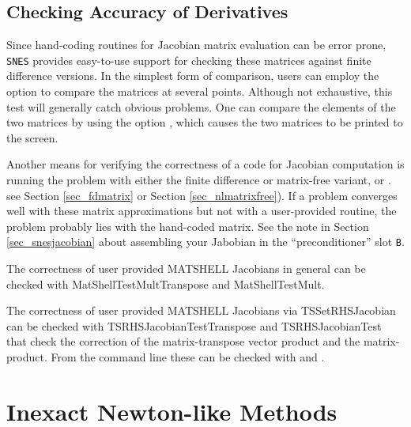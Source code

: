 \subsection{Checking Accuracy of Derivatives}
\label{sec_snesderivs}

Since hand-coding routines for Jacobian matrix evaluation
can be error prone, \lstinline{SNES} provides easy-to-use support for checking
these matrices against finite difference versions.  In the simplest
form of comparison, users can employ the option  
to compare the matrices at several points.  Although not exhaustive,
this test will generally catch obvious problems.  One can compare the
elements of the two matrices by using the option  , which causes the two
matrices to be printed to the screen.  

Another means for verifying the correctness of a code for Jacobian
computation is running the problem with either the finite
difference or matrix-free variant,  or .
see Section \ref{sec_fdmatrix} or Section \ref{sec_nlmatrixfree}).
If a problem converges well
with these matrix approximations but not with a user-provided routine,
the problem probably lies with the hand-coded
matrix. 
See the note in Section \ref{sec_snesjacobian} about assembling your Jabobian
in the ``preconditioner'' slot \lstinline{B}.

The correctness of user provided MATSHELL Jacobians in general can be checked with
MatShellTestMultTranspose and MatShellTestMult.

The correctness of user provided MATSHELL Jacobians via TSSetRHSJacobian can be checked with
TSRHSJacobianTestTranspose and TSRHSJacobianTest that check the correction of the matrix-transpose vector product and the matrix-product. From
the command line these can be checked with    and  .



\section{Inexact Newton-like Methods}

